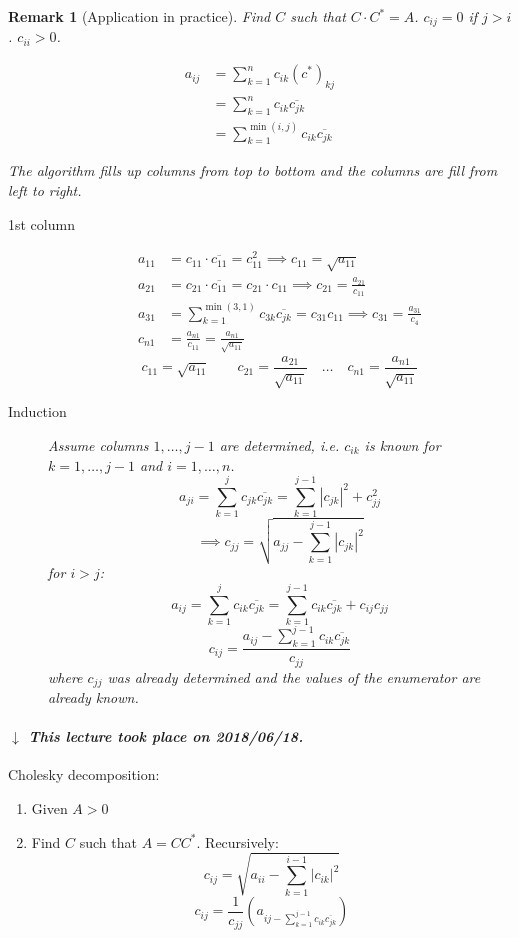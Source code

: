 \documentclass{article}
\newtheorem{remark}{Remark}  \numberwithin{remark}{section}
\newcommand{\card}[1]{\left|#1\right|}
\newcommand{\dateref}[1]{%
  \begin{mdframed}[backgroundcolor=gray!10,innerbottommargin=0pt,innertopmargin=0pt]
    \paragraph{\textit{$\downarrow$ This lecture took place on #1.}}%
  \end{mdframed}%
}
\begin{document}
\begin{remark}[Application in practice]
  Find $C$ such that $C \cdot C^* = A$.
  $c_{ij} = 0$ if $j > i$.
  $c_{ii} > 0$.

  \begin{align*}
    a_{ij} &= \sum_{k=1}^n c_{ik} (c^*)_{kj} \\
      &= \sum_{k=1}^n c_{ik} \overline{c_{jk}} \\
      &= \sum_{k=1}^{\min(i,j)} c_{ik} \overline{c_{jk}}
  \end{align*}

  The algorithm fills up columns from top to bottom and the columns are fill from left to right.

  \begin{description}
    \item[1st column] 
      \begin{align*}
        a_{11} &= c_{11} \cdot \overline{c_{11}} = c_{11}^2 \implies c_{11} = \sqrt{a_{11}} \\
        a_{21} &= c_{21} \cdot \overline{c_{11}} = c_{21} \cdot c_{11} \implies c_{21} = \frac{a_{21}}{c_{11}} \\
        a_{31} &= \sum_{k=1}^{\min(3,1)} c_{3k} \overline{c_{jk}} = c_{31} c_{11} \implies c_{31} = \frac{a_{31}}{c_4} \\
        c_{n1} &= \frac{a_{n1}}{c_{11}} = \frac{a_{n1}}{\sqrt{a_{11}}}
      \end{align*}
      \[ c_{11} = \sqrt{a_{11}} \qquad c_{21} = \frac{a_{21}}{\sqrt{a_{11}}} \quad \dots \quad c_{n1} = \frac{a_{n1}}{\sqrt{a_{11}}} \]
    \item[Induction]
      Assume columns $1, \dots, j-1$ are determined, i.e. $c_{ik}$ is known for $k = 1, \dots, j-1$ and $i = 1, \dots, n$.
      \[ a_{ji} = \sum_{k=1}^j c_{jk} \overline{c_{jk}} = \sum_{k=1}^{j-1} \card{c_{jk}}^2 + c_{jj}^2 \]
      \[ \implies c_{jj} = \sqrt{a_{jj} - \sum_{k=1}^{j-1} \card{c_{jk}}^2} \]
      for $i > j$:
      \[ a_{ij} = \sum_{k=1}^j  c_{ik} \overline{c_{jk}} = \sum_{k=1}^{j-1} c_{ik} \overline{c_{jk}} + c_{ij} c_{jj} \]
      \[ c_{ij} = \frac{a_{ij} - \sum_{k=1}^{j-1} c_{ik} \overline{c_{jk}}}{c_{jj}} \]
      where $c_{jj}$ was already determined and the values of the enumerator are already known.
  \end{description}
\end{remark}

\dateref{2018/06/18}

Cholesky decomposition:
\begin{enumerate}
  \item Given $A > 0$
  \item Find $C$ such that $A = CC^*$. Recursively:
    \[ c_{ij} = \sqrt{a_{ii} - \sum_{k=1}^{i-1} \card{c_{ik}}^2} \]
    \[ c_{ij} = \frac{1}{c_{jj}} (a_{ij - \sum_{k=1}^{j-1} c_{ik} \overline{c_{jk}}}) \]
\end{enumerate}
\end{document}
